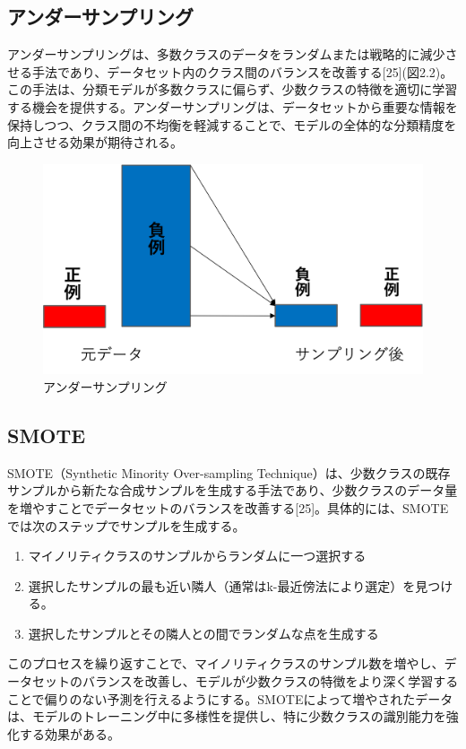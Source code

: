 \documentclass[platex]{suribt}
\begin{document}
\subsection{アンダーサンプリング}
アンダーサンプリングは、多数クラスのデータをランダムまたは戦略的に減少させる手法であり、データセット内のクラス間のバランスを改善する[25](図2.2)。この手法は、分類モデルが多数クラスに偏らず、少数クラスの特徴を適切に学習する機会を提供する。アンダーサンプリングは、データセットから重要な情報を保持しつつ、クラス間の不均衡を軽減することで、モデルの全体的な分類精度を向上させる効果が期待される。

\begin{figure}[H]
  \centering
  \includegraphics[scale=0.6]{undersampling.png}
  \caption{アンダーサンプリング}    \label{undersampling}
\end{figure}

\subsection{SMOTE}
SMOTE（Synthetic Minority Over-sampling Technique）は、少数クラスの既存サンプルから新たな合成サンプルを生成する手法であり、少数クラスのデータ量を増やすことでデータセットのバランスを改善する[25]。具体的には、SMOTEでは次のステップでサンプルを生成する。

\begin{enumerate}
   \item マイノリティクラスのサンプルからランダムに一つ選択する
   \item 選択したサンプルの最も近い隣人（通常はk-最近傍法により選定）を見つける。
   \item 選択したサンプルとその隣人との間でランダムな点を生成する
\end{enumerate}

このプロセスを繰り返すことで、マイノリティクラスのサンプル数を増やし、データセットのバランスを改善し、モデルが少数クラスの特徴をより深く学習することで偏りのない予測を行えるようにする。SMOTEによって増やされたデータは、モデルのトレーニング中に多様性を提供し、特に少数クラスの識別能力を強化する効果がある。
\end{document}
